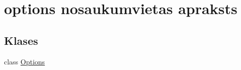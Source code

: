\hypertarget{namespaceoptions}{}\section{options nosaukumvietas apraksts}
\label{namespaceoptions}
\subsection*{Klases}
\begin{DoxyCompactItemize}
\item 
class \hyperlink{classoptions_1_1_options}{Options}
\end{DoxyCompactItemize}
